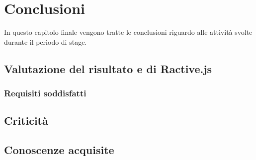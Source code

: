 
\chapter{Conclusioni}
\label{cap:conclusioni}

In questo capitolo finale vengono tratte le conclusioni riguardo alle attività svolte durante il periodo di stage.

\section{Valutazione del risultato e di Ractive.js}

\subsection{Requisiti soddisfatti}

\section{Criticità}

\section{Conoscenze acquisite}
